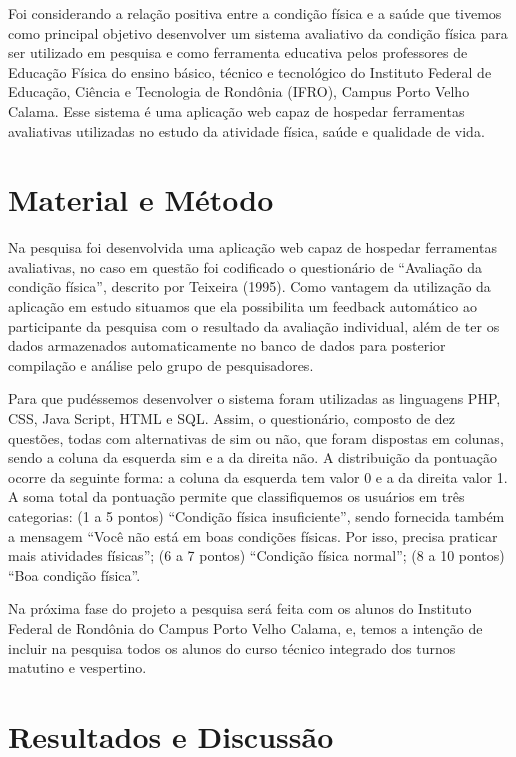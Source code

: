\documentclass[article,12pt,onesidea,4paper,english,brazil]{abntex2}
\begin{document}
Foi considerando a relação positiva entre a condição física e a saúde que tivemos como principal objetivo desenvolver um sistema avaliativo da condição física para ser utilizado em pesquisa e como ferramenta educativa pelos professores de Educação Física do ensino básico, técnico e tecnológico do Instituto Federal de Educação, Ciência e Tecnologia de Rondônia (IFRO), Campus Porto Velho Calama. Esse sistema é uma aplicação web capaz de hospedar ferramentas avaliativas utilizadas no estudo da atividade física, saúde e qualidade de vida.
	
	\section*{Material e Método}
	
	Na pesquisa foi desenvolvida uma aplicação web capaz de hospedar ferramentas avaliativas, no caso em questão foi codificado o questionário de “Avaliação da condição física”, descrito por Teixeira (1995). Como vantagem da utilização da aplicação em estudo situamos que ela possibilita um feedback automático ao participante da pesquisa com o resultado da avaliação individual, além de ter os dados armazenados automaticamente no banco de dados para posterior compilação e análise pelo grupo de pesquisadores.
	
	Para que pudéssemos desenvolver o sistema foram utilizadas as linguagens PHP, CSS, Java Script, HTML e SQL. Assim, o questionário, composto de dez questões, todas com alternativas de sim ou não, que foram dispostas em colunas, sendo a coluna da esquerda sim e a da direita não. A distribuição da pontuação ocorre da seguinte forma: a coluna da esquerda tem valor 0 e a da direita valor 1. A soma total da pontuação permite que classifiquemos os usuários em três categorias: (1 a 5 pontos) “Condição física insuficiente”, sendo fornecida também a mensagem “Você não está em boas condições físicas. Por isso, precisa praticar mais atividades físicas”; (6 a 7 pontos) “Condição física normal”; (8 a 10 pontos) “Boa condição física”.
	
	Na próxima fase do projeto a pesquisa será feita com os alunos do Instituto Federal de Rondônia do Campus Porto Velho Calama, e, temos a intenção de incluir na pesquisa todos os alunos do curso técnico integrado dos turnos matutino e vespertino.
	
	\section*{Resultados e Discussão}
	
\end{document}
